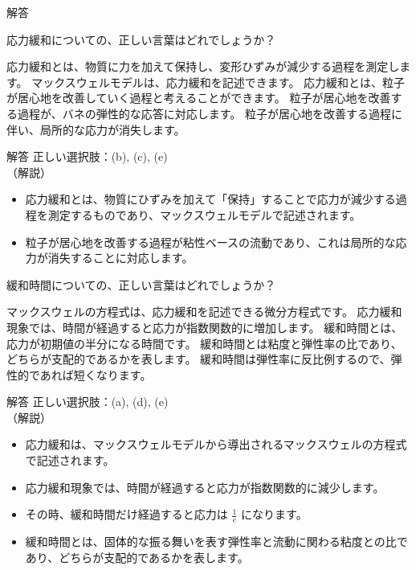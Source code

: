 \documentclass[uplatex,dvipdfmx,a4paper,11pt]{jsarticle}
\begin{document}
\begin{qlist}
\begin{itembox}[l]{解答}
        \end{itembox}
	\qitem 応力緩和についての、正しい言葉はどれでしょうか？
		\begin{qlist2}
			\qitem 応力緩和とは、物質に力を加えて保持し、変形ひずみが減少する過程を測定します。
			\qitem マックスウェルモデルは、応力緩和を記述できます。
			\qitem 応力緩和とは、粒子が居心地を改善していく過程と考えることができます。
			\qitem 粒子が居心地を改善する過程が、バネの弾性的な応答に対応します。
			\qitem 粒子が居心地を改善する過程に伴い、局所的な応力が消失します。
		\end{qlist2}
		\vspace{3mm}
        \begin{itembox}[l]{解答}
            正しい選択肢：(b), (c), (e)\\
            （解説）
			\begin{itemize}
				\item 応力緩和とは、物質にひずみを加えて「保持」することで応力が減少する過程を測定するものであり、マックスウェルモデルで記述されます。
				\item 粒子が居心地を改善する過程が粘性ベースの流動であり、これは局所的な応力が消失することに対応します。
			\end{itemize}
        \end{itembox}
	\qitem 緩和時間についての、正しい言葉はどれでしょうか？
		\begin{qlist2}
			\qitem マックスウェルの方程式は、応力緩和を記述できる微分方程式です。
			\qitem 応力緩和現象では、時間が経過すると応力が指数関数的に増加します。
			\qitem 緩和時間とは、応力が初期値の半分になる時間です。
			\qitem 緩和時間とは粘度と弾性率の比であり、どちらが支配的であるかを表します。
			\qitem 緩和時間は弾性率に反比例するので、弾性的であれば短くなります。
		\end{qlist2}
		\vspace{3mm}
        \begin{itembox}[l]{解答}
            正しい選択肢：(a), (d), (e)\\
            （解説）
			\begin{itemize}
				\item 応力緩和は、マックスウェルモデルから導出されるマックスウェルの方程式で記述されます。
				\item 応力緩和現象では、時間が経過すると応力が指数関数的に減少します。
				\item その時、緩和時間だけ経過すると応力は $\frac{1}{e}$ になります。
				\item 緩和時間とは、固体的な振る舞いを表す弾性率と流動に関わる粘度との比であり、どちらが支配的であるかを表します。

\end{itemize}
\end{itembox}
\end{qlist}
\end{document}
